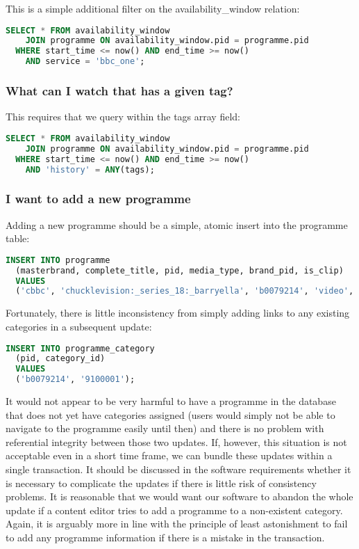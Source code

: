 \documentclass[11pt,a4paper]{article}
\begin{document}
This is a simple additional filter on the availability\_window relation:

\begin{lstlisting}[language=SQL]
  SELECT * FROM availability_window
    JOIN programme ON availability_window.pid = programme.pid
  WHERE start_time <= now() AND end_time >= now()
    AND service = 'bbc_one';
\end{lstlisting}

\subsubsection{What can I watch that has a given tag?}

This requires that we query within the tags array field:

\begin{lstlisting}[language=SQL]
  SELECT * FROM availability_window
    JOIN programme ON availability_window.pid = programme.pid
  WHERE start_time <= now() AND end_time >= now()
    AND 'history' = ANY(tags);
\end{lstlisting}

\subsubsection{I want to add a new programme}

Adding a new programme should be a simple, atomic insert into the programme
table:

\begin{lstlisting}[language=SQL]
  INSERT INTO programme
  (masterbrand, complete_title, pid, media_type, brand_pid, is_clip)
  VALUES
  ('cbbc', 'chucklevision:_series_18:_barryella', 'b0079214', 'video', 'b006w487', '0');
\end{lstlisting}

Fortunately, there is little inconsistency from simply adding links
to any existing categories in a subsequent update:

\begin{lstlisting}[language=SQL]
  INSERT INTO programme_category
  (pid, category_id)
  VALUES
  ('b0079214', '9100001');
\end{lstlisting}

It would not appear to be very harmful to have a programme in the database
that does not yet have categories assigned (users would simply not be able to
navigate to the programme easily until then) and there is no problem
with referential integrity between those two updates. If, however,
this situation is not acceptable even in a short time frame, we can bundle
these updates within a single transaction. It should be discussed in the
software requirements whether it is necessary to complicate the updates
if there is little risk of consistency problems. It is reasonable that
we would want our software to abandon the whole update if a content
editor tries to add a programme to a non-existent category. Again,
it is arguably more in line with the principle of least astonishment to
fail to add any programme information if there is a mistake in the transaction.
\end{document}
